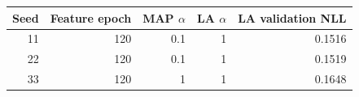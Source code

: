 \begin{tabular}{rrrrr}\toprule
Seed & Feature epoch & MAP $\alpha$ & LA $\alpha$ & LA validation NLL \\\midrule
11 & 120 & 0.1 & 1 & 0.1516\\
22 & 120 & 0.1 & 1 & 0.1519\\
33 & 120 & 1 & 1 & 0.1648\\
\bottomrule\end{tabular}
